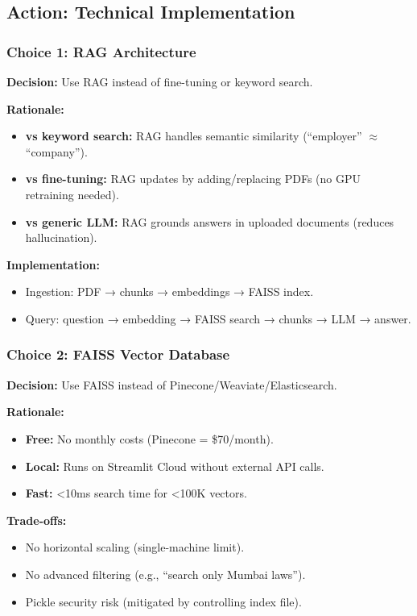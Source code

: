 \documentclass[11pt,a4paper]{article}
\begin{document}
\subsection{Action: Technical Implementation}

\subsubsection{Choice 1: RAG Architecture}

\textbf{Decision:} Use RAG instead of fine-tuning or keyword search.

\textbf{Rationale:}
\begin{itemize}
\item \textbf{vs keyword search:} RAG handles semantic similarity (``employer'' $\approx$ ``company'').
\item \textbf{vs fine-tuning:} RAG updates by adding/replacing PDFs (no GPU retraining needed).
\item \textbf{vs generic LLM:} RAG grounds answers in uploaded documents (reduces hallucination).
\end{itemize}

\textbf{Implementation:}
\begin{itemize}
\item Ingestion: PDF → chunks → embeddings → FAISS index.
\item Query: question → embedding → FAISS search → chunks → LLM → answer.
\end{itemize}

\subsubsection{Choice 2: FAISS Vector Database}

\textbf{Decision:} Use FAISS instead of Pinecone/Weaviate/Elasticsearch.

\textbf{Rationale:}
\begin{itemize}
\item \textbf{Free:} No monthly costs (Pinecone = \$70/month).
\item \textbf{Local:} Runs on Streamlit Cloud without external API calls.
\item \textbf{Fast:} <10ms search time for <100K vectors.
\end{itemize}

\textbf{Trade-offs:}
\begin{itemize}
\item No horizontal scaling (single-machine limit).
\item No advanced filtering (e.g., ``search only Mumbai laws'').
\item Pickle security risk (mitigated by controlling index file).
\end{itemize}
\end{document}
